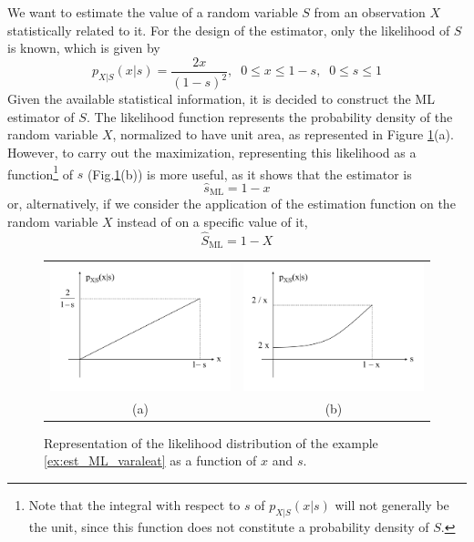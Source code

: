 \begin{example}[ML Estimation]
\label{ex:est_ML_varaleat}

We want to estimate the value of a random variable $S$ from an observation $X$ statistically related to it. For the design of the estimator, only the likelihood of $S$ is known, which is given by
\begin{equation}
p_{X|S}(x|s) = \frac{2 x}{(1 - s)^2},\;\; 0 \le x \le 1-s,\;\; 0 \le s \le 1
\end{equation}
Given the available statistical information, it is decided to construct the ML estimator of $S$. The likelihood function represents the probability density of the random variable $X$, normalized to have unit area, as represented in Figure \ref{fig:est_ML_caso1}(a). However, to carry out the maximization, representing this likelihood as a function\footnote{Note that the integral with respect to $s$ of $p_{X|S}(x|s)$ will not generally be the unit, since this function does not constitute a probability density of $S$.} of $s$ (Fig.\ref{fig:est_ML_caso1}(b)) is more useful, as it shows that the estimator is
$$\hat s_{\text{ML}} = 1 - x$$
or, alternatively, if we consider the application of the estimation function on the random variable $X$ instead of on a specific value of it,
$$\hat S_{\text{ML}} = 1 - X$$

\begin{figure}[t]
  \begin{center}
  \begin{tabular}{cc}
    \includegraphics[width=6cm]{Figures//px_s_funcionx.png} &
   
   \includegraphics[width=6cm]{Figures//px_s_funcions.png}\\
    (a) & (b)
  \end{tabular}
    \caption{Representation of the likelihood distribution of the example \ref{ex:est_ML_varaleat} as a function of $x$ and $s$.}
    \label{fig:est_ML_caso1}
  \end{center}
\end{figure}

\end{example}

